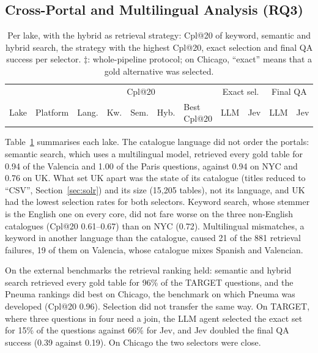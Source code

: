 \subsection{Cross-Portal and Multilingual Analysis (RQ3)}
\label{sec:results-cross}

\begin{table}[t]
\caption{Per lake, with the hybrid as retrieval strategy: Cpl@20 of keyword,
semantic and hybrid search, the strategy with the highest Cpl@20, exact
selection and final QA success per selector. $\ddagger$: whole-pipeline
protocol; on Chicago, ``exact'' means that a gold alternative was
selected.}
\label{tab:cross}
\centering
\scriptsize
\setlength{\tabcolsep}{2.5pt}
\begin{tabular}{lll|ccc|l|cc|cc}
\hline
 & & & \multicolumn{3}{c|}{Cpl@20} & & \multicolumn{2}{c|}{Exact sel.} & \multicolumn{2}{c}{Final QA} \\
Lake & Platform & Lang. & Kw. & Sem. & Hyb. & Best Cpl@20 & LLM & Jev & LLM & Jev \\
\hline
\hline
\end{tabular}
\end{table}

Table~\ref{tab:cross} summarises each lake. The catalogue language did not
order the portals: semantic search, which uses a multilingual model, retrieved
every gold table for 0.94 of the Valencia and 1.00 of the Paris questions,
against 0.94 on NYC and 0.76 on UK. What set UK apart was the state of its
catalogue (titles reduced to ``CSV'', Section~\ref{sec:solr}) and its size
(15{,}205 tables), not its language, and UK had the lowest selection rates for
both selectors. Keyword search, whose stemmer is the English one on every
core, did not fare worse on the three non-English catalogues (Cpl@20
0.61--0.67) than on NYC (0.72). Multilingual mismatches, a keyword in another
language than the catalogue, caused 21 of the 881 retrieval failures, 19 of
them on Valencia, whose catalogue mixes Spanish and Valencian.

On the external benchmarks the retrieval ranking held: semantic and hybrid
search retrieved every gold table for 96\% of the TARGET questions, and the
Pneuma rankings did best on Chicago, the benchmark on which Pneuma was
developed (Cpl@20 0.96). Selection did not transfer the same way. On TARGET,
where three questions in four need a join, the LLM agent selected the exact
set for 15\% of the questions against 66\% for Jev, and Jev doubled the final
QA success (0.39 against 0.19). On Chicago the two selectors were close.

